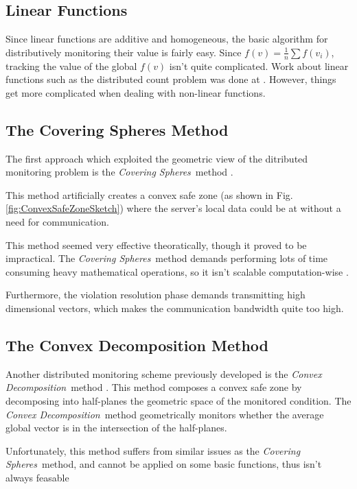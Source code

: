 \documentclass[11pt, conference]{article}
\newcommand{\coveringSpheres}{\textit{Covering Spheres}}
\newcommand{\convexDecomposition}{\textit{Convex Decomposition}}
\begin{document}
\subsection{Linear Functions}

Since linear functions are additive and homogeneous, the basic algorithm for distributively monitoring their value is fairly easy. Since ${f(v) = \frac{1}{n}\sum f(v_i)}$, tracking the value of the global $f(v)$ isn't quite complicated. Work about linear functions such as the distributed count problem was done at \cite{keralapura2006communication}. However, things get more complicated when dealing with non-linear functions.

\subsection{The Covering Spheres Method}

The first approach which exploited the geometric view of the ditributed monitoring problem is the \coveringSpheres \ method \cite{sharfman2007geometric}.

This method artificially creates a convex safe zone (as shown in Fig. \ref{fig:ConvexSafeZoneSketch}) where the server's local data could be at without a need for communication.

This method seemed very effective theoratically, though it proved to be impractical. The \coveringSpheres \ method demands performing lots of time consuming heavy mathematical operations, so it isn't scalable computation-wise \cite{lazerson2018lightweight}.

Furthermore, the violation resolution phase demands transmitting high dimensional vectors, which makes the communication bandwidth quite too high.

\subsection{The Convex Decomposition Method}

Another distributed monitoring scheme previously developed is the \convexDecomposition \ method \cite{lazerson2015monitoring}. This method composes a convex safe zone by decomposing into half-planes the geometric space of the monitored condition. The \convexDecomposition \ method geometrically monitors whether the average global vector is in the intersection of the half-planes.

Unfortunately, this method suffers from similar issues as the \coveringSpheres \ method, and cannot be applied on some basic functions, thus isn't always feasable \cite{lazerson2018lightweight}
\end{document}
